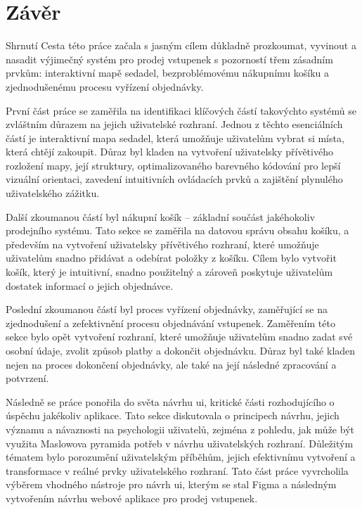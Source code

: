 \chapter*{Závěr}
\label{ch:zaver}

\begin{section}{Shrnutí}
    \label{sec:zaver-shrnuti}
    Cesta této práce začala s jasným cílem důkladně prozkoumat, vyvinout a nasadit výjimečný systém pro prodej vstupenek s pozorností třem zásadním prvkům: interaktivní mapě sedadel, bezproblémovému nákupnímu košíku a zjednodušenému procesu vyřízení objednávky.

    První část práce se zaměřila na identifikaci klíčových částí takovýchto systémů se zvláštním důrazem na jejich uživatelské rozhraní.
    Jednou z těchto esenciálních částí je interaktivní mapa sedadel, která umožňuje uživatelům vybrat si místa, která chtějí zakoupit.
    Důraz byl kladen na vytvoření uživatelsky přívětivého rozložení mapy, její struktury, optimalizovaného barevného kódování pro lepší vizuální orientaci, zavedení intuitivních ovládacích prvků a zajištění plynulého uživatelského zážitku.

    Další zkoumanou částí byl nákupní košík – základní součást jakéhokoliv prodejního systému.
    Tato sekce se zaměřila na datovou správu obsahu košíku, a především na vytvoření uživatelsky přívětivého rozhraní, které umožňuje uživatelům snadno přidávat a odebírat položky z košíku.
    Cílem bylo vytvořit košík, který je intuitivní, snadno použitelný a zároveň poskytuje uživatelům dostatek informací o jejich objednávce.

    Poslední zkoumanou částí byl proces vyřízení objednávky, zaměřující se na zjednodušení a zefektivnění procesu objednávání vstupenek.
    Zaměřením této sekce bylo opět vytvoření rozhraní, které umožňuje uživatelům snadno zadat své osobní údaje, zvolit způsob platby a dokončit objednávku.
    Důraz byl také kladen nejen na proces dokončení objednávky, ale také na její následné zpracování a potvrzení.

    Následně se práce ponořila do světa návrhu \ac{ui}, kritické části rozhodujícího o úspěchu jakékoliv aplikace.
    Tato sekce diskutovala o principech návrhu, jejich významu a návaznosti na psychologii uživatelů, zejména z pohledu, jak může být využita Maslowova pyramida potřeb v návrhu uživatelských rozhraní.
    Důležitým tématem bylo porozumění uživatelským příběhům, jejich efektivnímu vytvoření a transformace v reálné prvky uživatelského rozhraní.
    Tato část práce vyvrcholila výběrem vhodného nástroje pro návrh \ac{ui}, kterým se stal Figma a následným vytvořením návrhu webové aplikace pro prodej vstupenek.


\end{section}
